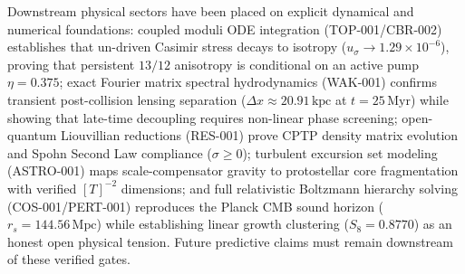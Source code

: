 \documentclass[11pt]{article}
\begin{document}
Downstream physical sectors have been placed on explicit dynamical and numerical
foundations: coupled moduli ODE integration (TOP-001/CBR-002) establishes that
un-driven Casimir stress decays to isotropy ($u_\sigma \to 1.29\times 10^{-6}$),
proving that persistent $13/12$ anisotropy is conditional on an active pump $\eta = 0.375$;
exact Fourier matrix spectral hydrodynamics (WAK-001) confirms transient post-collision
lensing separation ($\Delta x \approx 20.91\,\mathrm{kpc}$ at $t = 25\,\mathrm{Myr}$) while
showing that late-time decoupling requires non-linear phase screening;
open-quantum Liouvillian reductions (RES-001) prove CPTP density matrix evolution and
Spohn Second Law compliance ($\sigma \ge 0$);
turbulent excursion set modeling (ASTRO-001) maps scale-compensator gravity to protostellar
core fragmentation with verified $[T]^{-2}$ dimensions; and full relativistic Boltzmann
hierarchy solving (COS-001/PERT-001) reproduces the Planck CMB sound horizon ($r_s = 144.56\,\mathrm{Mpc}$)
while establishing linear growth clustering ($S_8 = 0.8770$) as an honest open physical tension.
Future predictive claims must remain downstream of these verified gates.


\end{document}
